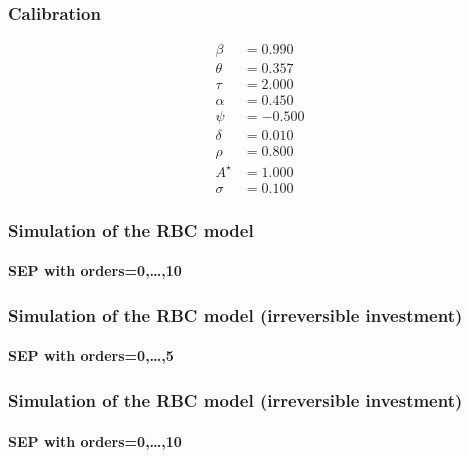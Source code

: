 \documentclass{beamer}
\begin{document}
\begin{frame}
   \frametitle{Calibration}
   \begin{align*}
      \beta   & =  0.990 \\
      \theta  & =  0.357 \\
      \tau    & =  2.000 \\
      \alpha  & =  0.450 \\
      \psi    & = -0.500 \\
      \delta  & =  0.010 \\
      \rho    & =  0.800 \\
      A^\star & =  1.000 \\
      \sigma  & =  0.100
   \end{align*}
\end{frame}


\begin{frame}
   \frametitle{Simulation of the RBC model}
   \framesubtitle{SEP with orders=0,\dots,10}
   \begin{center}
      \scalebox{.5}{
         }
   \end{center}

\end{frame}


\begin{frame}
   \frametitle{Simulation of the RBC model (irreversible investment)}
   \framesubtitle{SEP with orders=0,\dots,5}
   \begin{center}
      \scalebox{.5}{
         }
   \end{center}

\end{frame}


\begin{frame}
   \frametitle{Simulation of the RBC model (irreversible investment)}
   \framesubtitle{SEP with orders=0,\dots,10}
   \begin{center}
      \scalebox{.5}{
         }
   \end{center}

\end{frame}
\end{document}
